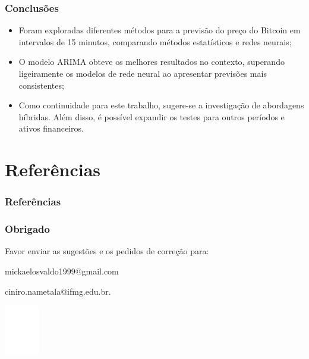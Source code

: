 \documentclass[aspectratio=169]{beamer}
\begin{document}
\begin{frame}[fragile] \frametitle{Conclusões}
	\begin{itemize}
		\item Foram exploradas diferentes métodos para a previsão do preço do Bitcoin em intervalos de 15 minutos, comparando métodos estatísticos e redes neurais;
		
		\item O modelo ARIMA obteve os melhores resultados no contexto, superando ligeiramente os modelos de rede neural ao apresentar previsões mais consistentes;
		\item Como continuidade para este trabalho, sugere-se a investigação de abordagens
		híbridas. Além disso, é possível expandir os testes para outros períodos e ativos financeiros.
	\end{itemize}
\end{frame}

\section{Referências}

\begin{frame}[allowframebreaks] 
\frametitle{Referências}
  \printbibliography 
\end{frame}

\begin{frame} \frametitle{Obrigado}
\begin{center}
 \vspace*{2em}

 Favor enviar as sugestões e os pedidos de correção para:

 mickaelosvaldo1999@gmail.com 
 
 ciniro.nametala@ifmg.edu.br.

 \vspace*{2em}
 \includegraphics[width=1.5cm]{logoif}
\end{center}
\end{frame}
\end{document}
